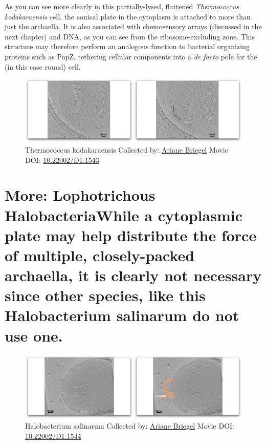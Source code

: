 \documentclass[]{tufte-book}
\begin{document}
As you can see more clearly in this partially-lysed, flattened
\emph{Thermococcus kodakaraensis} cell, the conical plate in the
cytoplasm is attached to more than just the archaella. It is also
associated with chemosensory arrays (discussed in the next chapter) and
DNA, as you can see from the ribosome-excluding zone. This structure may
therefore perform an analogous function to bacterial organizing proteins
such as PopZ, tethering cellular components into a \emph{de facto} pole
for the (in this case round) cell.





\begin{figure}
\includegraphics{movie_stills/6_9b} \caption[Thermococcus kodakaraensis Collected by:
\protect\hyperlink{ariane_briegel}{Ariane Briegel} Movie DOI:
\href{https://doi.org/10.22002/D1.1543}{10.22002/D1.1543}]{Thermococcus kodakaraensis Collected by:
\protect\hyperlink{ariane_briegel}{Ariane Briegel} Movie DOI:
\href{https://doi.org/10.22002/D1.1543}{10.22002/D1.1543}}\label{fig:6-9b}
\end{figure}

\section{More: Lophotrichous HalobacteriaWhile a cytoplasmic plate may
help distribute the force of multiple, closely-packed archaella, it is
clearly not necessary since other species, like this Halobacterium
salinarum do not use
one.}\label{more-lophotrichous-halobacteriawhile-a-cytoplasmic-plate-may-help-distribute-the-force-of-multiple-closely-packed-archaella-it-is-clearly-not-necessary-since-other-species-like-this-halobacterium-salinarum-do-not-use-one.}





\begin{figure}
\includegraphics{movie_stills/6_9c} \caption[Halobacterium salinarum Collected by:
\protect\hyperlink{ariane_briegel}{Ariane Briegel} Movie DOI:
\href{https://doi.org/10.22002/D1.1544}{10.22002/D1.1544}]{Halobacterium salinarum Collected by:
\protect\hyperlink{ariane_briegel}{Ariane Briegel} Movie DOI:
\href{https://doi.org/10.22002/D1.1544}{10.22002/D1.1544}}\label{fig:6-9c}
\end{figure}
\end{document}
